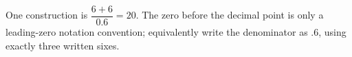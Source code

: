 One construction is $\boxed{\dfrac{6+6}{0.6}=20}$. The zero before the decimal point is only a leading-zero notation convention; equivalently write the denominator as $.6 $, using exactly three written sixes.
